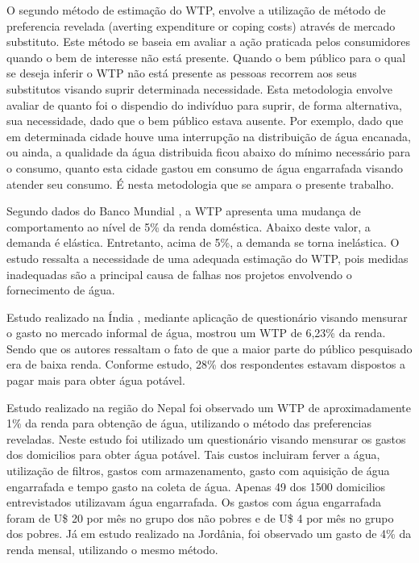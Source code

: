 \documentclass[
  12pt,
]{book}
\begin{document}
O segundo método de estimação do WTP, envolve a utilização de método de preferencia revelada (averting expenditure or coping costs) através de mercado substituto. Este método se baseia em avaliar a ação praticada pelos consumidores quando o bem de interesse não está presente. Quando o bem público para o qual se deseja inferir o WTP não está presente as pessoas recorrem aos seus substitutos visando suprir determinada necessidade. Esta metodologia envolve avaliar de quanto foi o dispendio do indivíduo para suprir, de forma alternativa, sua necessidade, dado que o bem público estava ausente. Por exemplo, dado que em determinada cidade houve uma interrupção na distribuição de água encanada, ou ainda, a qualidade da água distribuida ficou abaixo do mínimo necessário para o consumo, quanto esta cidade gastou em consumo de água engarrafada visando atender seu consumo. É nesta metodologia que se ampara o presente trabalho.

Segundo dados do Banco Mundial \citep{littlefair}, a WTP apresenta uma mudança de comportamento ao nível de 5\% da renda doméstica. Abaixo deste valor, a demanda é elástica. Entretanto, acima de 5\%, a demanda se torna inelástica. O estudo ressalta a necessidade de uma adequada estimação do WTP, pois medidas inadequadas são a principal causa de falhas nos projetos envolvendo o fornecimento de água.

Estudo realizado na Índia \citep{Venkatachalam}, mediante aplicação de questionário visando mensurar o gasto no mercado informal de água, mostrou um WTP de 6,23\% da renda. Sendo que os autores ressaltam o fato de que a maior parte do público pesquisado era de baixa renda. Conforme estudo, 28\% dos respondentes estavam dispostos a pagar mais para obter água potável.

Estudo realizado \citep{pattanayak} na região do Nepal foi observado um WTP de aproximadamente 1\% da renda para obtenção de água, utilizando o método das preferencias reveladas. Neste estudo foi utilizado um questionário visando mensurar os gastos dos domicilios para obter água potável. Tais custos incluiram ferver a água, utilização de filtros, gastos com armazenamento, gasto com aquisição de água engarrafada e tempo gasto na coleta de água. Apenas 49 dos 1500 domicilios entrevistados utilizavam água engarrafada. Os gastos com água engarrafada foram de U\$ 20 por mês no grupo dos não pobres e de U\$ 4 por mês no grupo dos pobres. Já em estudo realizado na Jordânia, \citep{OrgillMeyer}foi observado um gasto de 4\% da renda mensal, utilizando o mesmo método.
\end{document}
